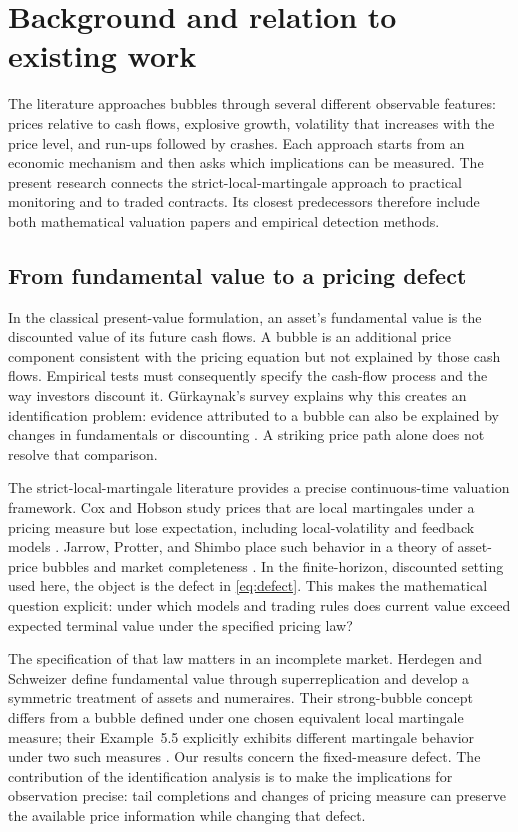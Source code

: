 \section{Background and relation to existing work}\label{sec:literature}
The literature approaches bubbles through several different observable
features: prices relative to cash flows, explosive growth, volatility that
increases with the price level, and run-ups followed by crashes. Each approach
starts from an economic mechanism and then asks which implications can be
measured. The present research connects the strict-local-martingale approach
to practical monitoring and to traded contracts. Its closest predecessors
therefore include both mathematical valuation papers and empirical detection
methods.

\subsection{From fundamental value to a pricing defect}
In the classical present-value formulation, an asset's fundamental value is
the discounted value of its future cash flows. A bubble is an additional
price component consistent with the pricing equation but not explained by
those cash flows. Empirical tests must consequently specify the cash-flow
process and the way investors discount it. G\"urkaynak's survey explains why
this creates an identification problem: evidence attributed to a bubble can
also be explained by changes in fundamentals or discounting
\cite{gurkaynak2005econometric}. A striking price path alone does not resolve
that comparison.

The strict-local-martingale literature provides a precise continuous-time
valuation framework. Cox and Hobson study prices that are local martingales
under a pricing measure but lose expectation, including local-volatility
and feedback models \cite{cox2005local}. Jarrow, Protter, and Shimbo place
such behavior in a theory of asset-price bubbles and market completeness
\cite{jarrow2007complete}. In the finite-horizon, discounted setting used
here, the object is the defect in \eqref{eq:defect}. This makes the
mathematical question explicit: under which models and trading rules does
current value exceed expected terminal value under the specified pricing law?

The specification of that law matters in an incomplete market. Herdegen
and Schweizer define fundamental value through superreplication and develop
a symmetric treatment of assets and numeraires. Their strong-bubble concept
differs from a bubble defined under one chosen equivalent local martingale
measure; their Example~5.5 explicitly exhibits different martingale behavior
under two such measures \cite{herdegen2016strong}. Our results concern the
fixed-measure defect. The contribution of the identification analysis is to
make the implications for observation precise: tail completions and changes
of pricing measure can preserve the available price information while
changing that defect.

